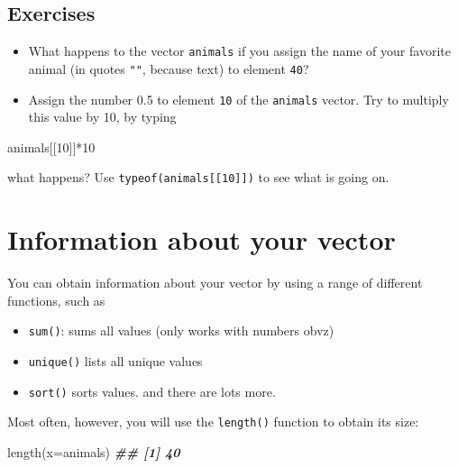\documentclass[
]{book}
\newenvironment{Shaded}{\begin{snugshade}}{\end{snugshade}}
\newcommand{\AttributeTok}[1]{\textcolor[rgb]{0.77,0.63,0.00}{#1}}
\newcommand{\DecValTok}[1]{\textcolor[rgb]{0.00,0.00,0.81}{#1}}
\newcommand{\DocumentationTok}[1]{\textcolor[rgb]{0.56,0.35,0.01}{\textbf{\textit{#1}}}}
\newcommand{\FunctionTok}[1]{\textcolor[rgb]{0.00,0.00,0.00}{#1}}
\newcommand{\NormalTok}[1]{#1}
\newcommand{\SpecialCharTok}[1]{\textcolor[rgb]{0.00,0.00,0.00}{#1}}
\providecommand{\tightlist}{%
  \setlength{\itemsep}{0pt}\setlength{\parskip}{0pt}}
\begin{document}
\hypertarget{exercises}{%
\subsection{Exercises}\label{exercises}}

\begin{itemize}
\item
  What happens to the vector \texttt{animals} if you assign the name of your favorite animal (in quotes \texttt{""}, because text) to element \texttt{40}?
\item
  Assign the number 0.5 to element \texttt{10} of the \texttt{animals} vector. Try to multiply this value by 10, by typing
\end{itemize}

\begin{Shaded}
\begin{Highlighting}[]
\NormalTok{animals[[}\DecValTok{10}\NormalTok{]]}\SpecialCharTok{*}\DecValTok{10}
\end{Highlighting}
\end{Shaded}

what happens? Use \texttt{typeof(animals{[}{[}10{]}{]})} to see what is going on.

\hypertarget{information-about-your-vector}{%
\section{Information about your vector}\label{information-about-your-vector}}

You can obtain information about your vector by using a range of different functions, such as

\begin{itemize}
\tightlist
\item
  \texttt{sum()}: sums all values (only works with numbers obvz)\\
\item
  \texttt{unique()} lists all unique values\\
\item
  \texttt{sort()} sorts values.
  and there are lots more.
\end{itemize}

Most often, however, you will use the \texttt{length()} function to obtain its size:

\begin{Shaded}
\begin{Highlighting}[]
\FunctionTok{length}\NormalTok{(}\AttributeTok{x=}\NormalTok{animals)}
\DocumentationTok{\#\# [1] 40}
\end{Highlighting}
\end{Shaded}
\end{document}
